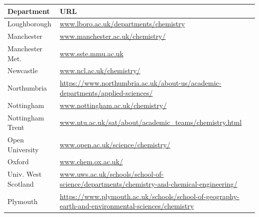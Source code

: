 \begin{table}[H]
 \begin{tabular}{||p{4cm}|Y||}
\hline
 Department                         & URL \\
\hline
\footnotesize{Loughborough               }        & \footnotesize{\url{www.lboro.ac.uk/departments/chemistry}}                                                                                         \\
 \footnotesize{Manchester                }         & \footnotesize{\url{www.manchester.ac.uk/chemistry/}}                                                                                               \\
 \footnotesize{Manchester Met.  }          & \footnotesize{\url{www.sste.mmu.ac.uk}}                                                                                                            \\
 \footnotesize{Newcastle  }                        & \footnotesize{\url{www.ncl.ac.uk/chemistry/}}                                                                                                      \\
 \footnotesize{Northumbria}                        & \footnotesize{\url{https://www.northumbria.ac.uk/about-us/academic-departments/applied-sciences/}}\\
 \footnotesize{Nottingham                  }       & \footnotesize{\url{www.nottingham.ac.uk/chemistry/}}                                                                                               \\
 \footnotesize{Nottingham Trent}        & \footnotesize{\url{www.ntu.ac.uk/sat/about/academic\_teams/chemistry.html}}                                                                         \\
\footnotesize{ Open University }                   & \footnotesize{\url{www.open.ac.uk/science/chemistry/}}                                                                                             \\
 \footnotesize{Oxford}                             & \footnotesize{\url{www.chem.ox.ac.uk/}}                                                                                                            \\
 \footnotesize{Univ. West Scotland} & \footnotesize{\url{www.uws.ac.uk/schools/school-of-science/departments/chemistry-and-chemical-engineering/}}                                       \\
 \footnotesize{Plymouth               }            & \footnotesize{\url{https://www.plymouth.ac.uk/schools/school-of-geography-earth-and-environmental-sciences/chemistry}}                                    \\

\end{tabular}
\end{table}
